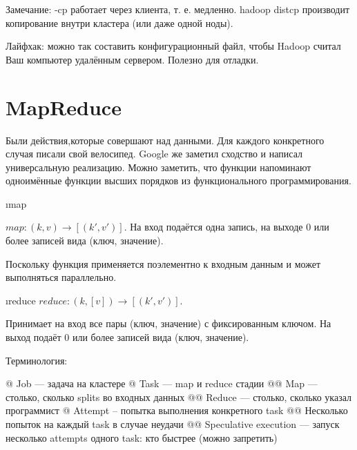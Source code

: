 Замечание: -cp работает через клиента, т. е. медленно. hadoop distcp производит копирование внутри кластера (или даже одной ноды). 

Лайфхак: можно так составить конфигурационный файл, чтобы Hadoop считал Ваш компьютер удалённым сервером. Полезно для отладки.

\section{MapReduce}
Были действия,которые совершают над данными. Для каждого конкретного случая писали свой велосипед. Google же заметил сходство и написал универсальную реализацию. Можно заметить, что функции напоминают одноимённые функции высших порядков из функционального программирования.

\begin{enumerate}
 \i map
 
  $map: (k, v) \to [(k', v')]$.
  На вход подаётся одна запись, на выходе 0 или более записей вида (ключ, значение).
  
  Поскольку функция применяется поэлементно к входным данным и может выполняться параллельно.
  
 \i reduce
  $reduce: (k, [v]) \to [(k', v')]$.
  
  Принимает на вход все пары (ключ, значение) с фиксированным ключом. На выход подаёт 0 или более записей вида (ключ, значение).
  
\end{enumerate}

Терминология:
\begin{el}[ul]
@ Job --- задача на кластере
@ Task --- map и reduce стадии
@@ Map --- столько, сколько splits во входных данных
@@ Reduce --- столько, сколько указал программист
@ Attempt – попытка выполнения конкретного task
@@ Несколько попыток на каждый task в случае неудачи
@@ Speculative execution --- запуск несколько attempts одного task: кто быстрее (можно запретить)
\end{el}

